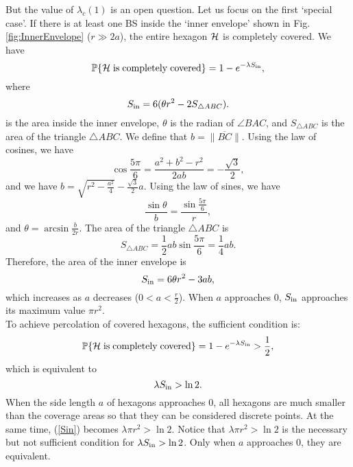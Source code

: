 \documentclass[final]{IEEEtran}
\begin{document}
 \indent But the value of 
$\lambda_c(1)$ is an open question. Let us focus on the first `special case'. If there is at least one BS inside the `inner envelope' shown in Fig.\ref{fig:InnerEnvelope} ($r\gg 2a$), the entire hexagon ${\mathcal{H}}$ is completely covered. We have
\begin{equation}
    \mathbb{P}\{{\mathcal{H}} {\rm \;is\; completely\; covered}\}=1-e^{-\lambda S_{\rm in}},
\end{equation}
where
\begin{equation}
    S_{\rm in}=6(\theta r^2-2S_{\bigtriangleup ABC}).
\end{equation}
is the area inside the inner envelope, $\theta$ is the radian of $\angle BAC$, and $S_{\bigtriangleup ABC}$ is the area of the triangle $\bigtriangleup ABC$. We define that $b=\|\overline{BC}\|$. Using the law of cosines, we have
\begin{equation}
\cos \frac{5\pi}{6}=\frac{a^2+b^2-r^2}{2ab}=-\frac{\sqrt{3}}{2}, 
\end{equation}
and we have $b=\sqrt{r^2-\frac{a^2}{4}}-\frac{\sqrt{3}}{2}a$. Using the law of sines, we have
\begin{equation}
    \frac{\sin \theta}{b}=\frac{\sin \frac{5\pi}{6}}{r},
\end{equation}
and $\theta=\arcsin{\frac{b}{2r}}$. The area of the triangle $\bigtriangleup ABC$ is 
\begin{equation}
    S_{\bigtriangleup ABC}=\frac{1}{2}ab\sin \frac{5\pi}{6}=\frac{1}{4}ab.
\end{equation}
\indent Therefore, the area of the inner envelope is 
\begin{equation}
    S_{\rm in}=6\theta r^2-3ab,
\end{equation}
which increases as $a$ decreases ($0<a<\frac{r}{2}$). When $a$ approaches 0, $S_{\rm in}$ approaches its maximum value $\pi r^2$.\\
\indent To achieve percolation of covered hexagons, the sufficient condition is:
\begin{equation}
    \mathbb{P}\{{\mathcal{H}} {\rm \;is\; completely\; covered}\}=1-e^{-\lambda S_{\rm in}}>\frac{1}{2},
\end{equation}
which is equivalent to 
\begin{equation} \label{Sin}
    \lambda S_{\rm in}> \ln 2.
\end{equation}
\indent When the side length $a$ of hexagons approaches 0, all hexagons are much smaller than the coverage areas so that they can be considered discrete points. At the same time, (\ref{Sin}) becomes $\lambda \pi r^2 >\ln 2$. Notice that $\lambda \pi r^2 >\ln 2$ is the necessary but not sufficient condition for $\lambda S_{\rm in}> \ln 2$. Only when $a$ approaches 0, they are equivalent.
\end{document}
